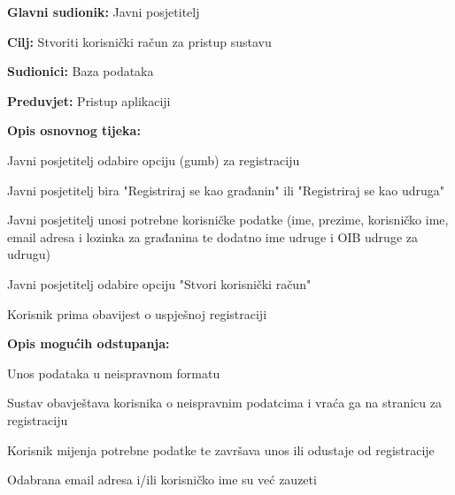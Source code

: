 	
			\noindent {}
			\begin{packed_item}
				
				\item \textbf{Glavni sudionik:} Javni posjetitelj
				\item  \textbf{Cilj:} Stvoriti korisnički račun za pristup sustavu
				\item  \textbf{Sudionici:} Baza podataka
				\item  \textbf{Preduvjet:} Pristup aplikaciji
				\item  \textbf{Opis osnovnog tijeka:}
				
				\item[] \begin{packed_enum}
					
					\item Javni posjetitelj odabire opciju (gumb) za registraciju 
					\item Javni posjetitelj bira "Registriraj se kao građanin" ili "Registriraj se kao udruga"
					\item Javni posjetitelj unosi potrebne korisničke podatke (ime, prezime, korisničko ime, email adresa i lozinka za građanina te dodatno ime udruge i OIB udruge za udrugu)
					\item Javni posjetitelj odabire opciju "Stvori korisnički račun"
					\item Korisnik prima obavijest o uspješnoj registraciji
				\end{packed_enum}
				
				\item  \textbf{Opis mogućih odstupanja:}
				
				\item[] \begin{packed_item}
					
					\item [2.a] Unos podataka u neispravnom formatu 
					\item[] \begin{packed_enum}
						
						\item Sustav obavještava korisnika o neispravnim podatcima i vraća ga na stranicu za registraciju
						\item Korisnik mijenja potrebne podatke te završava unos ili odustaje od registracije

					\end{packed_enum}
					\item [2.b] Odabrana email adresa i/ili korisničko ime su već zauzeti
					\item[] \begin{packed_enum}
					

\end{packed_enum}
\end{packed_item}
\end{packed_item}
